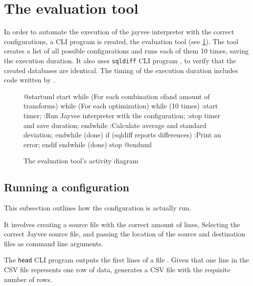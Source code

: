 \section{The evaluation tool}
In order to automate the execution of the jayvee interpreter with the correct configurations, a \ac{CLI} program is created, the evaluation tool (see \ref{fig:uml:evalation-tool}).
The tool creates a list of all possible configurations and runs each of them 10 times, saving the execution duration.
It also uses \Verb|sqldiff| \ac{CLI} program \autocite{sqldiff}, to verify that the created databases are identical.
The timing of the execution duration includes code written by \textcite{so:benchmark}.

\begin{figure}
	\begin{plantuml}
		@startuml
		start
		while (For each combination of\nrowcount and amount of transforms)
		while (For each optimization)
		while (10 times)
		:start timer;
		:Run Jayvee interpreter with the configuration;
		:stop timer and save duration;
		endwhile
		:Calculate average and
		standard deviation;
		endwhile (done)
		if (sqldiff reports differences)
		:Print an error;
		endif
		endwhile (done)
		stop
		@enduml
	\end{plantuml}
	\caption{The evaluation tool's activity diagram}
	\label{fig:uml:evalation-tool}
\end{figure}

\subsection{Running a configuration}
This subsection outlines how the configuration is actually run.

It involves creating a source file with the correct amount of lines,
Selecting the correct Jayvee source file, and passing the location of the source and destination files as command line arguments.

The \Verb|head| \ac{CLI} program outputs the first lines of a file \autocite{head}.
Given that one line in the \ac{CSV} file represents one row of data, %
generates a \ac{CSV} file with the requisite number of rows.

